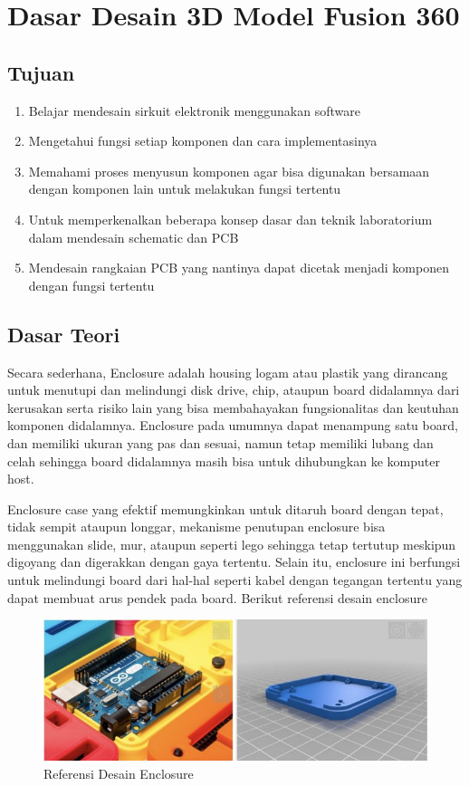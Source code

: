 \chapter{Dasar Desain 3D Model Fusion 360}

\section{Tujuan}
\begin{enumerate}
    \item Belajar mendesain sirkuit elektronik menggunakan software
    \item Mengetahui fungsi setiap komponen dan cara implementasinya
    \item Memahami proses menyusun komponen agar bisa digunakan bersamaan dengan komponen lain untuk melakukan fungsi tertentu
    \item Untuk memperkenalkan beberapa konsep dasar dan teknik laboratorium dalam mendesain schematic dan PCB
    \item Mendesain rangkaian PCB yang nantinya dapat dicetak menjadi komponen dengan fungsi tertentu
\end{enumerate}

\section{Dasar Teori}
Secara sederhana, Enclosure adalah housing logam atau plastik yang dirancang untuk menutupi dan
melindungi disk drive, chip, ataupun board didalamnya dari kerusakan serta risiko lain yang bisa
membahayakan fungsionalitas dan keutuhan komponen didalamnya. Enclosure pada umumnya dapat
menampung satu board, dan memiliki ukuran yang pas dan sesuai, namun tetap memiliki lubang dan celah
sehingga board didalamnya masih bisa untuk dihubungkan ke komputer host.

Enclosure case yang efektif memungkinkan untuk ditaruh board dengan tepat, tidak sempit ataupun
longgar, mekanisme penutupan enclosure bisa menggunakan slide, mur, ataupun seperti lego sehingga
tetap tertutup meskipun digoyang dan digerakkan dengan gaya tertentu. Selain itu, enclosure ini
berfungsi untuk melindungi board dari hal-hal seperti kabel dengan tegangan tertentu yang dapat
membuat arus pendek pada board. Berikut referensi desain enclosure
\begin{figure}[H]
    \centering
    \includegraphics[width=1\linewidth]{P3/img/image1.jpg}
    \caption{Referensi Desain Enclosure}
    \label{fig:Referensi Desain Enclosure}
\end{figure}

